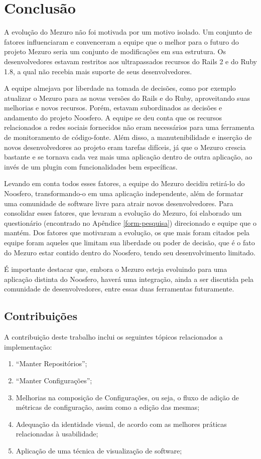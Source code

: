 \chapter{Conclusão}

A evolução do Mezuro não foi motivada por um motivo isolado. Um conjunto de fatores influenciaram e convenceram a equipe que o melhor para o futuro do projeto Mezuro seria um conjunto de modificações em sua estrutura. Os desenvolvedores estavam restritos aos ultrapassados recursos do Rails 2 e do Ruby 1.8, a qual não recebia mais suporte de seus desenvolvedores.

A equipe almejava por liberdade na tomada de decisões, como por exemplo atualizar o Mezuro para as novas versões do Rails e do Ruby, aproveitando suas melhorias e novos recursos. Porém, estavam subordinados as decisões e andamento do projeto Noosfero. A equipe se deu conta que os recursos relacionados a redes sociais fornecidos não eram necessários para uma ferramenta de monitoramento de código-fonte. Além disso, a manutenibilidade e inserção de novos desenvolvedores ao projeto eram tarefas difíceis, já que o Mezuro crescia bastante e se tornava cada vez mais uma aplicação dentro de outra aplicação, ao invés de um plugin com funcionalidades bem específicas.

Levando em conta todos esses fatores, a equipe do Mezuro decidiu retirá-lo do Noosfero, transformando-o em uma aplicação independente, além de formatar uma comunidade de software livre para atrair novos desenvolvedores. Para consolidar esses fatores, que levaram a evolução do Mezuro, foi elaborado um questionário (encontrado no Apêndice \ref{form-pesquisa}) direcionado e equipe que o mantém. Dos fatores que motivaram a evolução, os que mais foram citados pela equipe foram aqueles que limitam sua liberdade ou poder de decisão, que é o fato do Mezuro estar contido dentro do Noosfero, tendo seu desenvolvimento limitado.

É importante destacar que, embora o Mezuro esteja evoluindo para uma aplicação distinta do Noosfero, haverá uma integração, ainda a ser discutida pela comunidade de desenvolvedores, entre essas duas ferramentas futuramente.

\section{Contribuições}

A contribuição deste trabalho inclui os seguintes tópicos relacionados a implementação:
\begin{enumerate}
\item ``Manter Repositórios'';
\item ``Manter Configurações'';
\item Melhorias na composição de Configurações, ou seja, o fluxo de adição de métricas de configuração, assim como a edição das mesmas;
\item Adequação da identidade visual, de acordo com as melhores práticas relacionadas à usabilidade;
\item Aplicação de uma técnica de visualização de software;
\end{enumerate}

